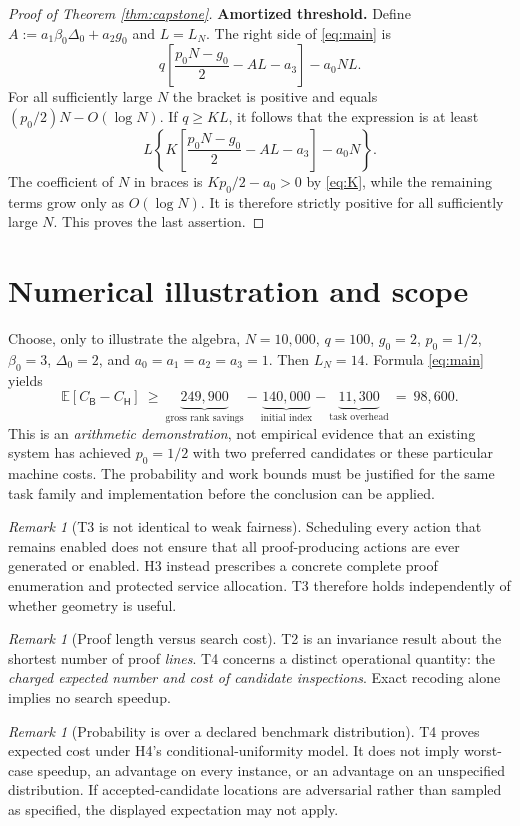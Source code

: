 \documentclass[11pt,letterpaper]{article}
\theoremstyle{definition}
\theoremstyle{remark}
\newtheorem{remark}[theorem]{Remark}
\newcommand{\E}{\mathbb{E}}
\newcommand{\Hsys}{\mathsf H}
\newcommand{\Bsys}{\mathsf B}
\begin{document}
\begin{proof}[Proof of Theorem \ref{thm:capstone}]
\medskip\noindent\textbf{Amortized threshold.}
Define $A:=a_1\beta_0\Delta_0+a_2g_0$ and $L=L_N$. The right side of \eqref{eq:main} is
\[
 q\left[\frac{p_0N-g_0}{2}-AL-a_3\right]-a_0NL.
\]
For all sufficiently large $N$ the bracket is positive and equals $(p_0/2)N-O(\log N)$. If $q\ge K L$, it follows that the expression is at least
\[
 L\left\{K\left[\frac{p_0N-g_0}{2}-AL-a_3\right]-a_0N\right\}.
\]
The coefficient of $N$ in braces is $Kp_0/2-a_0>0$ by \eqref{eq:K}, while the remaining terms grow only as $O(\log N)$. It is therefore strictly positive for all sufficiently large $N$. This proves the last assertion.
\end{proof}

\section{Numerical illustration and scope}
Choose, only to illustrate the algebra, $N=10{,}000$, $q=100$, $g_0=2$, $p_0=1/2$, $\beta_0=3$, $\Delta_0=2$, and $a_0=a_1=a_2=a_3=1$. Then $L_N=14$. Formula \eqref{eq:main} yields
\[
 \E[C_{\Bsys}-C_{\Hsys}]\ \ge\ \underbrace{249{,}900}_{\text{gross rank savings}}
 -\underbrace{140{,}000}_{\text{initial index}}-
 \underbrace{11{,}300}_{\text{task overhead}}\ =\ \boxed{98{,}600}.
\]
This is an \emph{arithmetic demonstration}, not empirical evidence that an existing system has achieved $p_0=1/2$ with two preferred candidates or these particular machine costs. The probability and work bounds must be justified for the same task family and implementation before the conclusion can be applied.

\begin{remark}[T3 is not identical to weak fairness]
Scheduling every action that remains enabled does not ensure that all proof-producing actions are ever generated or enabled. H3 instead prescribes a concrete complete proof enumeration and protected service allocation. T3 therefore holds independently of whether geometry is useful.
\end{remark}

\begin{remark}[Proof length versus search cost]
T2 is an invariance result about the shortest number of proof \emph{lines}. T4 concerns a distinct operational quantity: the \emph{charged expected number and cost of candidate inspections}. Exact recoding alone implies no search speedup.
\end{remark}

\begin{remark}[Probability is over a declared benchmark distribution]
T4 proves expected cost under H4's conditional-uniformity model. It does not imply worst-case speedup, an advantage on every instance, or an advantage on an unspecified distribution. If accepted-candidate locations are adversarial rather than sampled as specified, the displayed expectation may not apply.
\end{remark}
\end{document}
